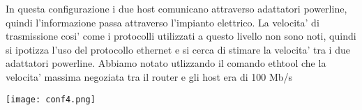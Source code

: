 \documentclass[../lab2.tex]{subfiles}
\begin{document}
    In questa configurazione i due host comunicano attraverso adattatori powerline,
    quindi l'informazione passa attraverso l'impianto elettrico.
    La velocita' di trasmissione cosi' come i protocolli utilizzati a questo livello
    non sono noti, quindi si ipotizza l'uso del protocollo ethernet e si cerca di 
    stimare la velocita' tra i due adattatori powerline.
    Abbiamo notato utlizzando il comando ethtool che la velocita' massima negoziata
    tra il router e gli host era di 100 Mb/s

    \begin{center}
        \texttt{[image: conf4.png]}
    \end{center}
\end{document}
